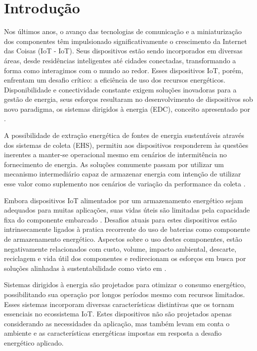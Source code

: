 \chapter{Introdução}
\label{cap:cap1}

Nos últimos anos, o avanço das tecnologias de comunicação e a miniaturização dos componentes têm impulsionado significativamente o crescimento da Internet das Coisas (\acl{IoT} - \acs{IoT}). Seus dispositivos estão sendo incorporados em diversas áreas, desde residências inteligentes até cidades conectadas, transformando a forma como interagimos com o mundo ao redor. Esses dispositivos \acs{IoT}, porém, enfrentam um desafio crítico: a eficiência de uso dos recursos energéticos. Disponibilidade e  conectividade constante exigem soluções inovadoras para a gestão de energia, seus esforços resultaram no desenvolvimento de dispositivos sob novo paradigma, os sistemas dirigidos à energia (\acl{EDC}), conceito apresentado por  .

A possibilidade de extração energética de fontes de energia sustentáveis através dos sistemas de coleta (\acl{EHS}), permitiu aos dispositivos responderem às questões inerentes a manter-se operacional mesmo em cenários de intermitência no fornecimento de energia. As soluções comumente passam por utilizar um mecanismo intermediário capaz de armazenar energia com intenção de utilizar esse valor como suplemento nos cenários de variação da performance da coleta \cite{kansal_power_2007}.

Embora dispositivos \acs{IoT} alimentados por um armazenamento energético sejam adequados para muitas aplicações, suas vidas úteis são limitadas pela capacidade fixa do componente embarcado \cite{sliper_energy-driven_2020}. Desafios atuais para estes dispositivos estão intrinsecamente ligados à pratica recorrente do uso de baterias como componente de armazenamento energético. Aspectos sobre o uso destes componentes, estão negativamente relacionados com custo, volume, impacto ambiental, descarte, reciclagem e vida útil dos componentes e redirecionam os esforços em busca por soluções alinhadas à sustentabilidade como visto em .

Sistemas dirigidos à energia são projetados para otimizar o consumo energético, possibilitando sua operação por longos períodos mesmo com recursos limitados. Esses sistemas incorporam diversas características distintivas que os tornam essenciais no ecossistema \acs{IoT}. Estes dispositivos não são projetados apenas considerando as necessidades da aplicação, mas também levam em conta o ambiente e as características energéticas impostas em resposta a desafio energético aplicado. 

